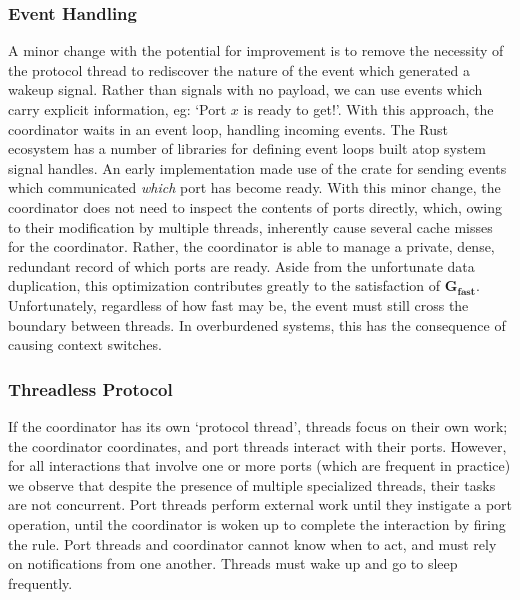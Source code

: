 \subsubsection{Event Handling}
A minor change with the potential for improvement is to remove the necessity of the protocol thread to rediscover the nature of the event which generated a wakeup signal. Rather than signals with no payload, we can use events which carry explicit information, eg: `Port $x$ is ready to get!'. With this approach, the coordinator waits in an event loop, handling incoming events. The Rust ecosystem has a number of libraries for defining event loops built atop system signal handles. An early implementation made use of the  crate for sending events which communicated \textit{which} port has become ready. With this minor change, the coordinator does not need to inspect the contents of ports directly, which, owing to their modification by multiple threads, inherently cause several cache misses for the coordinator. Rather, the coordinator is able to manage a private, dense, redundant record of which ports are ready. Aside from the unfortunate data duplication, this optimization contributes greatly to the satisfaction of $\boldsymbol{G_{fast}}$. Unfortunately, regardless of how fast  may be, the event must still cross the boundary between threads. In overburdened systems, this has the consequence of causing context switches.

\subsubsection{Threadless Protocol}
If the coordinator has its own `protocol thread', threads focus on their own work; the coordinator coordinates, and port threads interact with their ports. However, for all interactions that involve one or more ports (which are frequent in practice) we observe that despite the presence of multiple specialized threads, their tasks are not concurrent. Port threads perform external work until they instigate a port operation, until the coordinator is woken up to complete the interaction by firing the rule. Port threads and coordinator cannot know when to act, and must rely on notifications from one another. Threads must wake up and go to sleep frequently. 


